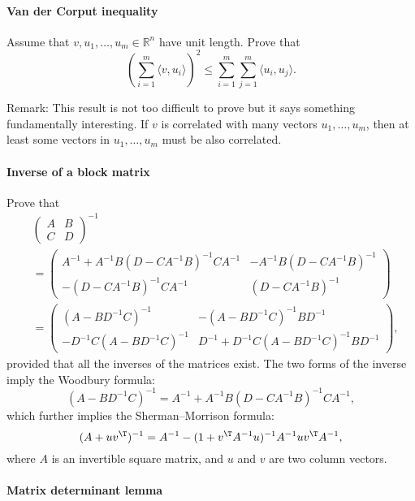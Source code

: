 \paragraph{Van der Corput inequality}
\label{hwmath1::vandercorputineq}

Assume that $v, u_1, \ldots, u_m \in \mathbb{R}^n$ have unit length. Prove  that 
$$
\left(  \sum_{i=1}^m   \langle v, u_i \rangle    \right)^2 \leq \sum_{i=1}^m \sum_{j=1}^m \langle u_i, u_j \rangle. 
$$


Remark: This result is not too difficult to prove but it says something fundamentally interesting. If $v$ is correlated with many vectors $u_1, \ldots, u_m$, then at least some vectors in  $u_1, \ldots, u_m$ must be also correlated. 



\paragraph{Inverse of a block matrix}\label{hwmath1::inverse-block-matrix}

Prove that 
\begin{align*}
&\left(\begin{array}{cc}
A & B\\
C & D
\end{array}\right)^{-1} \\
& =\left(\begin{array}{cc}
A^{-1}+A^{-1}B(D-CA^{-1}B)^{-1}CA^{-1} & -A^{-1}B(D-CA^{-1}B)^{-1}\\
-(D-CA^{-1}B)^{-1}CA^{-1} & (D-CA^{-1}B)^{-1}
\end{array}\right)\\
 & =\left(\begin{array}{cc}
(A-BD^{-1}C)^{-1} & -(A-BD^{-1}C)^{-1}BD^{-1}\\
-D^{-1}C (A-BD^{-1}C)^{-1} & D^{-1}+D^{-1}C(A-BD^{-1}C)^{-1}BD^{-1}
\end{array}\right),
\end{align*}
provided that all the inverses of the matrices exist. The two forms of the inverse imply the Woodbury formula:
\[
(A-BD^{-1}C)^{-1}=A^{-1}+A^{-1}B(D-CA^{-1}B)^{-1}CA^{-1},
\]
which further implies the Sherman--Morrison formula:
\[
(A+uv^{\T})^{-1}=A^{-1}-(1+v^{\T}A^{-1}u)^{-1}A^{-1}uv^{\T}A^{-1},
\]
where $A$ is an invertible square matrix,  and $u$ and $v$ are two column vectors. 



\paragraph{Matrix determinant lemma}\label{hwmath1::matrix-determinat-matrix}


